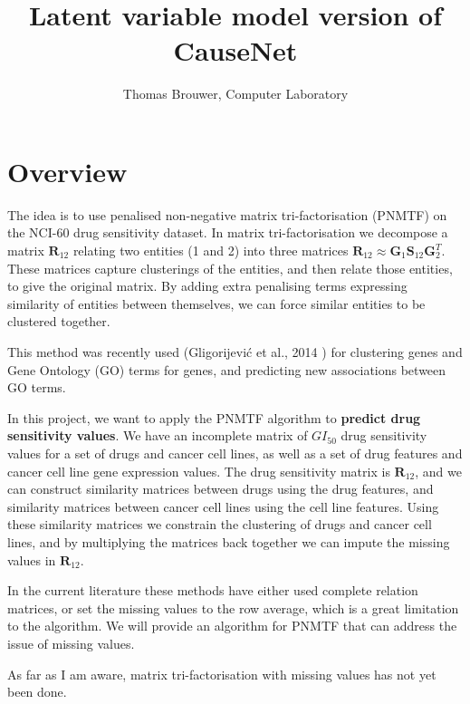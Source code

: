 \documentclass{article}
\begin{document}
	\title{Latent variable model version of CauseNet}
	\author{Thomas Brouwer, Computer Laboratory}
	\date{}
	\maketitle{}
	
	\section*{Overview}
		The idea is to use penalised non-negative matrix tri-factorisation (PNMTF) on the NCI-60 drug sensitivity dataset. In matrix tri-factorisation we decompose a matrix \( \boldsymbol R_{12} \) relating two entities (1 and 2) into three matrices \( \boldsymbol R_{12} \approx \boldsymbol G_1 \boldsymbol S_{12} \boldsymbol G_2^T \). These matrices capture clusterings of the entities, and then relate those entities, to give the original matrix. By adding extra penalising terms expressing similarity of entities between themselves, we can force similar entities to be clustered together. 
		
		This method was recently used (Gligorijevi\'{c} et al., 2014 \cite{gligorijevic_2014}) for clustering genes and Gene Ontology (GO) terms for genes, and predicting new associations between GO terms.
		
		In this project, we want to apply the PNMTF algorithm to \textbf{predict drug sensitivity values}. We have an incomplete matrix of \( GI_{50} \) drug sensitivity values for a set of drugs and cancer cell lines, as well as a set of drug features and cancer cell line gene expression values. The drug sensitivity matrix is \( \boldsymbol R_{12} \), and we can construct similarity matrices between drugs using the drug features, and similarity matrices between cancer cell lines using the cell line features. Using these similarity matrices we constrain the clustering of drugs and cancer cell lines, and by multiplying the matrices back together we can impute the missing values in \( \boldsymbol R_{12} \). 
		
		In the current literature these methods have either used complete relation matrices, or set the missing values to the row average, which is a great limitation to the algorithm. We will provide an algorithm for PNMTF that can address the issue of missing values.
		
		As far as I am aware, matrix tri-factorisation with missing values has not yet been done.
	
					
\end{document}
